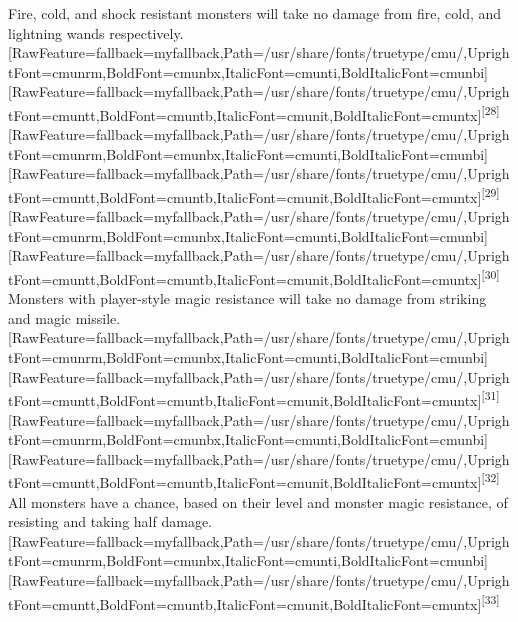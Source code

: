 Fire, cold, and shock resistant monsters will take no damage from fire, cold, and lightning wands respectively.\allowbreak{}\setmainfont{cmunrm.ttf}[RawFeature={fallback=myfallback},Path=/usr/share/fonts/truetype/cmu/,UprightFont=cmunrm,BoldFont=cmunbx,ItalicFont=cmunti,BoldItalicFont=cmunbi]\setmonofont{cmunrm.ttf}[RawFeature={fallback=myfallback},Path=/usr/share/fonts/truetype/cmu/,UprightFont=cmuntt,BoldFont=cmuntb,ItalicFont=cmunit,BoldItalicFont=cmuntx]\textsuperscript{{$\text{[}$}28{$\text{]}$}}\allowbreak{}\setmainfont{cmunrm.ttf}[RawFeature={fallback=myfallback},Path=/usr/share/fonts/truetype/cmu/,UprightFont=cmunrm,BoldFont=cmunbx,ItalicFont=cmunti,BoldItalicFont=cmunbi]\setmonofont{cmunrm.ttf}[RawFeature={fallback=myfallback},Path=/usr/share/fonts/truetype/cmu/,UprightFont=cmuntt,BoldFont=cmuntb,ItalicFont=cmunit,BoldItalicFont=cmuntx]\textsuperscript{{$\text{[}$}29{$\text{]}$}}\allowbreak{}\setmainfont{cmunrm.ttf}[RawFeature={fallback=myfallback},Path=/usr/share/fonts/truetype/cmu/,UprightFont=cmunrm,BoldFont=cmunbx,ItalicFont=cmunti,BoldItalicFont=cmunbi]\setmonofont{cmunrm.ttf}[RawFeature={fallback=myfallback},Path=/usr/share/fonts/truetype/cmu/,UprightFont=cmuntt,BoldFont=cmuntb,ItalicFont=cmunit,BoldItalicFont=cmuntx]\textsuperscript{{$\text{[}$}30{$\text{]}$}} Monsters with player-{}style magic resistance\footnotemark[116] will take no damage from striking and magic missile.\allowbreak{}\setmainfont{cmunrm.ttf}[RawFeature={fallback=myfallback},Path=/usr/share/fonts/truetype/cmu/,UprightFont=cmunrm,BoldFont=cmunbx,ItalicFont=cmunti,BoldItalicFont=cmunbi]\setmonofont{cmunrm.ttf}[RawFeature={fallback=myfallback},Path=/usr/share/fonts/truetype/cmu/,UprightFont=cmuntt,BoldFont=cmuntb,ItalicFont=cmunit,BoldItalicFont=cmuntx]\textsuperscript{{$\text{[}$}31{$\text{]}$}}\allowbreak{}\setmainfont{cmunrm.ttf}[RawFeature={fallback=myfallback},Path=/usr/share/fonts/truetype/cmu/,UprightFont=cmunrm,BoldFont=cmunbx,ItalicFont=cmunti,BoldItalicFont=cmunbi]\setmonofont{cmunrm.ttf}[RawFeature={fallback=myfallback},Path=/usr/share/fonts/truetype/cmu/,UprightFont=cmuntt,BoldFont=cmuntb,ItalicFont=cmunit,BoldItalicFont=cmuntx]\textsuperscript{{$\text{[}$}32{$\text{]}$}} All monsters have a chance, based on their level and monster magic resistance\footnotemark[117], of resisting and taking half damage.\allowbreak{}\setmainfont{cmunrm.ttf}[RawFeature={fallback=myfallback},Path=/usr/share/fonts/truetype/cmu/,UprightFont=cmunrm,BoldFont=cmunbx,ItalicFont=cmunti,BoldItalicFont=cmunbi]\setmonofont{cmunrm.ttf}[RawFeature={fallback=myfallback},Path=/usr/share/fonts/truetype/cmu/,UprightFont=cmuntt,BoldFont=cmuntb,ItalicFont=cmunit,BoldItalicFont=cmuntx]\textsuperscript{{$\text{[}$}33{$\text{]}$}}


